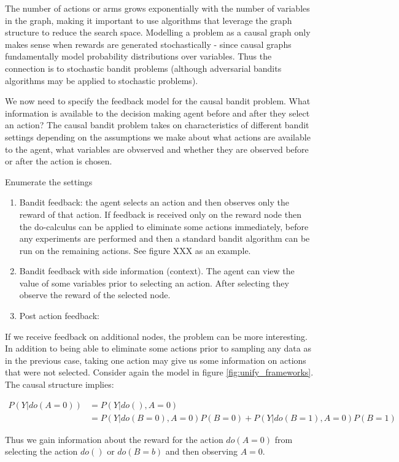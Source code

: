 \documentclass[11pt,a4paper,oneside]{book}
\newcommand{\eqn}[1]{\begin{align}#1\end{align}}
\begin{document}
The number of actions or arms grows exponentially with the number of variables in the graph,
making it important to use algorithms that leverage the graph structure to reduce the
search space. Modelling a problem as a causal graph only makes sense when rewards are generated stochastically - since causal graphs fundamentally model probability distributions over variables. Thus the connection is to stochastic bandit problems (although adversarial bandits algorithms may be applied to stochastic problems).

We now need to specify the feedback model for the causal bandit problem. What information is available to the decision making agent before and after they select an action? The causal bandit problem takes on characteristics of different bandit settings depending on the assumptions we make about what actions are available to the agent, what variables are obvserved and whether they are observed before or after the action is chosen. 

Enumerate the settings
\begin{enumerate}
\item Bandit feedback: the agent selects an action and then observes only the reward of that action. If feedback is received only on the reward node then the do-calculus can be applied to eliminate some actions immediately, before any experiments are performed and then a standard bandit algorithm can be run on the remaining actions. See figure XXX as an example. 
\item Bandit feedback with side information (context). The agent can view the value of some variables prior to selecting an action. After selecting they observe the reward of the selected node. 
\item Post action feedback:
\end{enumerate}

If we receive feedback on additional nodes, the problem can be more interesting. In addition to being able to eliminate some actions prior to sampling any data as in the previous case, taking one action may give us some information on actions that were not selected. Consider again the model in figure \ref{fig:unify_frameworks}. The causal structure implies: 

\eqn {
P(Y|do(A = 0)) &= P(Y|do(),A = 0) \\
&= P(Y|do(B=0),A=0)P(B=0)+P(Y|do(B=1),A=0)P(B=1) 
}

Thus we gain information about the reward for the action $do(A=0)$ from selecting the action $do()$ or $do(B = b)$ and then observing $A = 0$.  
\end{document}
